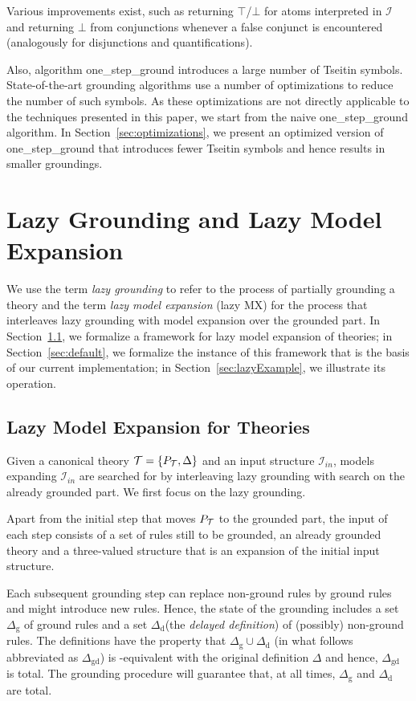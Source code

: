 \documentclass[11pt]{article}
\newcommand{\m}[1]{\ensuremath{#1}\xspace}
\newcommand{\true}{\m{\top}}
\newcommand{\false}{\m{\bot}}
\newcommand{\I}{\m{\mathcal{I}}}
\newcommand{\Iin}{\m{\I_{in}}}
\newcommand{\theory}{\m{\mathcal{T}}}
\newcommand{\D}{\m{\Delta}}
\newcommand{\logicname}[1]{\text{\sc #1}\xspace}
\newcommand{\foid}{\logicname{FO(\ensuremath{ID})}}
\theoremstyle{plain}
\theoremstyle{definition}
\theoremstyle{example_basic}
\theoremstyle{example_contd}
\theoremstyle{plain}
\newcommand{\groundone}{\textsf{one\_step\_ground}\xspace}
\newcommand{\Dg}{\ensuremath{\D_\text{g}}\xspace}
\newcommand{\Dd}{\ensuremath{\D_\text{d}}\xspace}
\newcommand{\Dgd}{\ensuremath{\D_\text{gd}}\xspace}
\newcommand{\pt}{\ensuremath{P_\text{\theory}}\xspace}
\newcommand{\change}[1]{#1}
\begin{document}
Various improvements exist, such as returning \true/\false for atoms interpreted in \I and returning \false from conjunctions whenever a false conjunct is encountered (analogously for disjunctions and quantifications).

Also, algorithm \groundone introduces a large number of Tseitin symbols. State-of-the-art grounding algorithms use a number of optimizations to reduce the number of such symbols. As these optimizations are not directly applicable to the techniques presented in this paper, we start from the naive \groundone algorithm. In Section~\ref{sec:optimizations}, we present an optimized version of \groundone that introduces fewer Tseitin symbols and hence results in smaller groundings. 

\section{Lazy Grounding and Lazy Model Expansion}\label{sec:theory}
We use the term \emph{lazy grounding} to refer to the process of partially grounding a theory and the term \emph{lazy model expansion} (lazy MX) for the process that interleaves lazy grounding with model expansion over the grounded part. In Section~\ref{sec:lazy-foid}, we formalize a framework for lazy model expansion of \foid theories;  in Section~\ref{sec:default}, we formalize the instance of this framework that is the basis of our current implementation; in Section~\ref{sec:lazyExample}, we illustrate its operation. 
\subsection{Lazy Model Expansion for \foid Theories}\label{sec:lazy-foid}

\change{Given a canonical theory $\theory = \{ \pt, \D\}$  and an input structure \Iin, models expanding \Iin are searched for by interleaving lazy grounding with search on the already grounded part. We first focus on the lazy grounding.}

\change{Apart from the initial step that moves \pt to the grounded part, the input of each step consists of a set of rules still to be grounded, an already grounded theory and a three-valued structure that is an expansion of the initial input structure.}

Each subsequent grounding step can replace non-ground rules by ground
rules and might introduce new rules. Hence, the state of the grounding
includes a set \Dg of ground rules and a set \Dd \change{(the \emph{delayed
  definition})} of (possibly) non-ground rules. The definitions have the property that $\Dg \cup \Dd$ (in what follows abbreviated as \Dgd) is \vocf{\D}-equivalent with the original definition \D and hence, \Dgd is total.
The grounding procedure will guarantee that, at all times, \Dg and \Dd are total.
\end{document}
